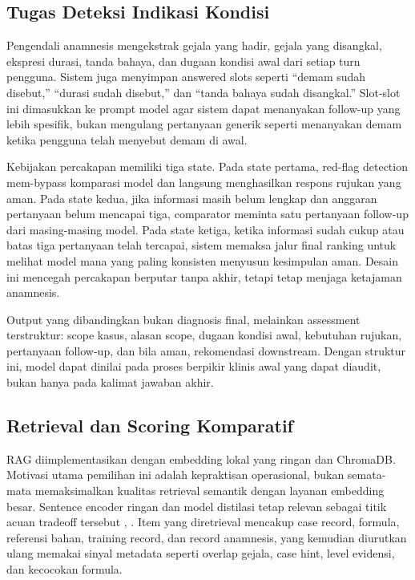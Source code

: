 \documentclass[conference]{IEEEtran}
\begin{document}
\subsection{Tugas Deteksi Indikasi Kondisi}
Pengendali anamnesis mengekstrak gejala yang hadir, gejala yang disangkal, ekspresi durasi, tanda bahaya, dan dugaan kondisi awal dari setiap turn pengguna. Sistem juga menyimpan answered slots seperti ``demam sudah disebut,'' ``durasi sudah disebut,'' dan ``tanda bahaya sudah disangkal.'' Slot-slot ini dimasukkan ke prompt model agar sistem dapat menanyakan follow-up yang lebih spesifik, bukan mengulang pertanyaan generik seperti menanyakan demam ketika pengguna telah menyebut demam di awal.

Kebijakan percakapan memiliki tiga state. Pada state pertama, red-flag detection mem-bypass komparasi model dan langsung menghasilkan respons rujukan yang aman. Pada state kedua, jika informasi masih belum lengkap dan anggaran pertanyaan belum mencapai tiga, comparator meminta satu pertanyaan follow-up dari masing-masing model. Pada state ketiga, ketika informasi sudah cukup atau batas tiga pertanyaan telah tercapai, sistem memaksa jalur final ranking untuk melihat model mana yang paling konsisten menyusun kesimpulan aman. Desain ini mencegah percakapan berputar tanpa akhir, tetapi tetap menjaga ketajaman anamnesis.

Output yang dibandingkan bukan diagnosis final, melainkan assessment terstruktur: scope kasus, alasan scope, dugaan kondisi awal, kebutuhan rujukan, pertanyaan follow-up, dan bila aman, rekomendasi downstream. Dengan struktur ini, model dapat dinilai pada proses berpikir klinis awal yang dapat diaudit, bukan hanya pada kalimat jawaban akhir.

\subsection{Retrieval dan Scoring Komparatif}
RAG diimplementasikan dengan embedding lokal yang ringan dan ChromaDB. Motivasi utama pemilihan ini adalah kepraktisan operasional, bukan semata-mata memaksimalkan kualitas retrieval semantik dengan layanan embedding besar. Sentence encoder ringan dan model distilasi tetap relevan sebagai titik acuan tradeoff tersebut \cite{b9}, \cite{b10}. Item yang diretrieval mencakup case record, formula, referensi bahan, training record, dan record anamnesis, yang kemudian diurutkan ulang memakai sinyal metadata seperti overlap gejala, case hint, level evidensi, dan kecocokan formula.
\end{document}

